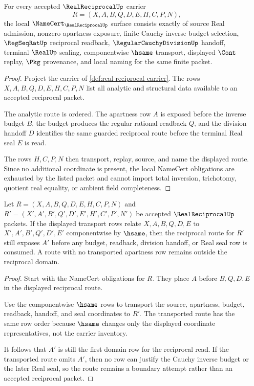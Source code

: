 \begin{theorem}
\label{thm:real-reciprocal-namecert-obligations}
For every accepted $\RealReciprocalUp$ carrier
$$
R=(X,A,B,Q,D,E,H,C,P,N),
$$
the local $\NameCert_{\RealReciprocalUp}$ surface consists exactly of source Real admission, nonzero-apartness exposure, finite Cauchy inverse budget selection, $\RegSeqRatUp$ reciprocal readback, $\RegularCauchyDivisionUp$ handoff, terminal $\RealUp$ sealing, componentwise $\hsame$ transport, displayed $\Cont$ replay, $\Pkg$ provenance, and local naming for the same finite packet.
\end{theorem}
\begin{proof}
Project the carrier of \autoref{def:real-reciprocal-carrier}. The rows $X,A,B,Q,D,E,H,C,P,N$ list all analytic and structural data available to an accepted reciprocal packet.

The analytic route is ordered. The apartness row $A$ is exposed before the inverse budget $B$, the budget produces the regular rational readback $Q$, and the division handoff $D$ identifies the same guarded reciprocal route before the terminal Real seal $E$ is read.

The rows $H,C,P,N$ then transport, replay, source, and name the displayed route. Since no additional coordinate is present, the local NameCert obligations are exhausted by the listed packet and cannot import total inversion, trichotomy, quotient real equality, or ambient field completeness.
\end{proof}

\begin{theorem}
\label{thm:real-reciprocal-apartness-domain-stability}
Let $R=(X,A,B,Q,D,E,H,C,P,N)$ and $R'=(X',A',B',Q',D',E',H',C',P',N')$ be accepted $\RealReciprocalUp$ packets. If the displayed transport rows relate $X,A,B,Q,D,E$ to $X',A',B',Q',D',E'$ componentwise by $\hsame$, then the reciprocal route for $R'$ still exposes $A'$ before any budget, readback, division handoff, or Real seal row is consumed. A route with no transported apartness row remains outside the reciprocal domain.
\end{theorem}
\begin{proof}
Start with the NameCert obligations for $R$. They place $A$ before $B,Q,D,E$ in the displayed reciprocal route.

Use the componentwise $\hsame$ rows to transport the source, apartness, budget, readback, handoff, and seal coordinates to $R'$. The transported route has the same row order because $\hsame$ changes only the displayed coordinate representatives, not the carrier inventory.

It follows that $A'$ is still the first domain row for the reciprocal read. If the transported route omits $A'$, then no row can justify the Cauchy inverse budget or the later Real seal, so the route remains a boundary attempt rather than an accepted reciprocal packet.
\end{proof}

